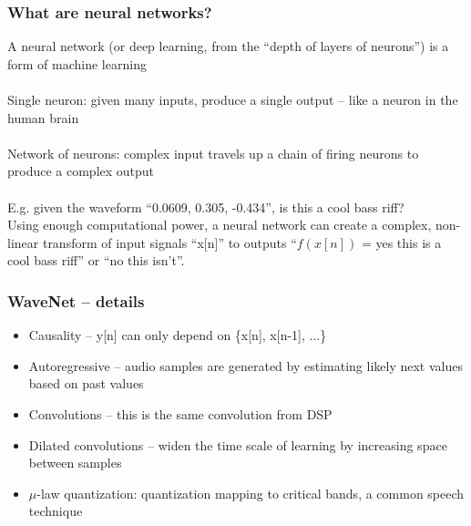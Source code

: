 \documentclass{beamer}
\begin{document}
\begin{frame}
	\frametitle{What are neural networks?}
	A neural network (or deep learning, from the ``depth of layers of neurons'') is a form of machine learning\\\ \\
	Single neuron: given many inputs, produce a single output -- like a neuron in the human brain\\\ \\
	Network of neurons: complex input travels up a chain of firing neurons to produce a complex output\\\ \\
	E.g. given the waveform ``0.0609, 0.305, -0.434'', is this a cool bass riff?\\
	Using enough computational power, a neural network can create a complex, non-linear transform of input signals ``x[n]'' to outputs ``$f(x[n])$ = yes this is a cool bass riff'' or ``no this isn't''.
\end{frame}


\begin{frame}
	\frametitle{WaveNet -- details}
	\begin{itemize}
		\item
			Causality -- y[n] can only depend on \{x[n], x[n-1], ...\}
		\item
			Autoregressive -- audio samples are generated by estimating likely next values based on past values
		\item
			Convolutions -- this is the same convolution from DSP
		\item
			Dilated convolutions -- widen the time scale of learning by increasing space between samples
		\item
			$\mu$-law quantization: quantization mapping to critical bands, a common speech technique
	\end{itemize}
\end{frame}
\end{document}
